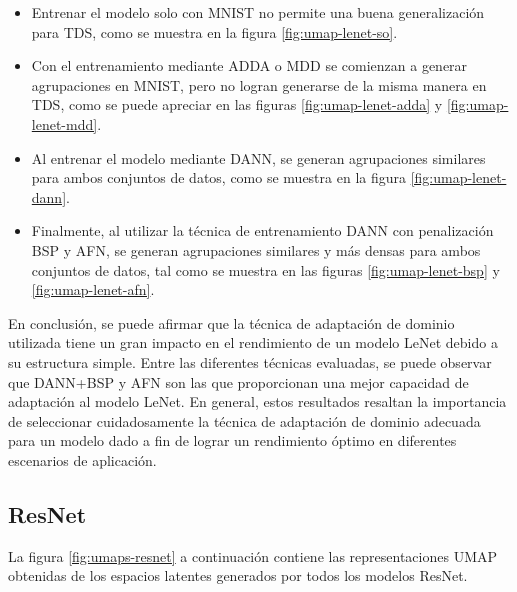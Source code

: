 \begin{itemize}
    \item Entrenar el modelo solo con MNIST no permite una buena generalización para TDS, como se muestra en la figura
          \ref{fig:umap-lenet-so}.
    \item Con el entrenamiento mediante ADDA o MDD se comienzan a generar agrupaciones en MNIST, pero no logran generarse de la
          misma manera en TDS, como se puede apreciar en las figuras \ref{fig:umap-lenet-adda} y \ref{fig:umap-lenet-mdd}.
    \item Al entrenar el modelo mediante DANN, se generan agrupaciones similares para ambos conjuntos de datos, como se muestra
          en la figura \ref{fig:umap-lenet-dann}.
    \item Finalmente, al utilizar la técnica de entrenamiento DANN con penalización BSP y AFN, se generan agrupaciones similares
          y más densas para ambos conjuntos de datos, tal como se muestra en las figuras \ref{fig:umap-lenet-bsp} y
          \ref{fig:umap-lenet-afn}.
\end{itemize}

En conclusión, se puede afirmar que la técnica de adaptación de dominio utilizada tiene un gran impacto en el
rendimiento de un modelo LeNet debido a su estructura simple. Entre las diferentes técnicas evaluadas, se puede
observar que DANN+BSP y AFN son las que proporcionan una mejor capacidad de adaptación al modelo LeNet. En general,
estos resultados resaltan la importancia de seleccionar cuidadosamente la técnica de adaptación de dominio adecuada
para un modelo dado a fin de lograr un rendimiento óptimo en diferentes escenarios de aplicación.

\subsection{ResNet}

La figura \ref{fig:umaps-resnet} a continuación contiene las representaciones UMAP obtenidas de los espacios latentes
generados por todos los modelos ResNet.

